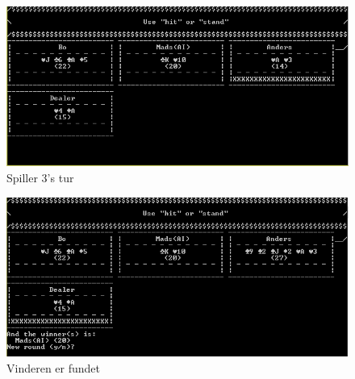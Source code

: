 \documentclass[a4paper]{article}
\begin{document}
        \begin{figure}[H]
          \includegraphics{figures/Player3Playing.PNG}

          \caption{Spiller 3's tur}
          \label{fig:player3Turn}
        \end{figure}

        \begin{figure}[H]
          \includegraphics{figures/WinnerIs.PNG}

          \caption{Vinderen er fundet}
          \label{fig:winnerIsFound}
        \end{figure}
\end{document}
